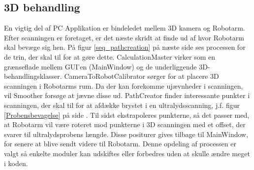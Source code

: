 \subsection{3D behandling}
En vigtig del af PC Applikation er bindeledet mellem 3D kamera og Robotarm. Efter scanningen er foretaget, er det næste skridt at finde ud af hvor Robotarm skal bevæge sig hen. På figur \ref{seq_pathcreation} på næste side ses processen for de trin, der skal til for at gøre dette. CalculationMaster virker som en grænseflade mellem GUI'en (MainWindow) og de underliggende 3D-behandlingsklasser. CameraToRobotCalibrator sørger for at placere 3D scanningen i Robotarms rum. Da der kan forekomme ujævnheder i scanningen, vil Smoother forsøge at jævne disse ud. PathCreator finder interessante punkter i scanningen, der skal til for at afdække brystet i en ultralydsscanning, j.f. figur \ref{Probensbevagelse} på side \pageref{Probensbevagelse}. Til sidst ekstrapoleres punkterne, så det passer med, at Robotarm vil være roteret mod punkterne i 3D scanningen med et offset, der svarer til ultralydsprobens længde. Disse positurer gives tilbage til MainWindow, for senere at blive sendt videre til Robotarm. Denne opdeling af processen er valgt så enkelte moduler kan udskiftes eller forbedres uden at skulle ændre meget i koden.

\newpage

